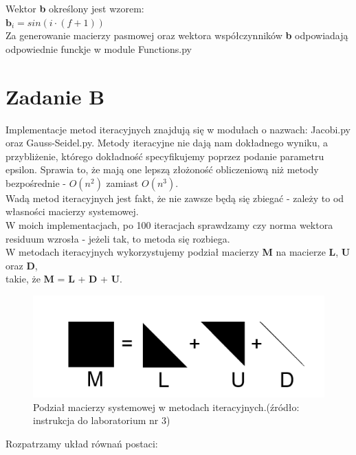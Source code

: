 \documentclass[fleqn]{article}
\begin{document}
    \noindent Wektor \textbf{b} określony jest wzorem:\\

    $\bm{b}_i = sin(i \cdot (f + 1))$ \\  

    \noindent Za generowanie macierzy pasmowej oraz wektora współczynników \textbf{b} odpowiadają
    odpowiednie funckje w module Functions.py
    \newpage


    \section{Zadanie B}
    Implementacje metod iteracyjnych znajdują się w modułach o nazwach: Jacobi.py oraz Gauss-Seidel.py.
    Metody iteracyjne nie dają nam dokładnego wyniku, a przybliżenie, którego dokładność
    specyfikujemy poprzez podanie parametru epsilon. Sprawia to, że mają one lepszą złożoność obliczeniową
    niż metody bezpośrednie - $O(n^2)$ zamiast $O(n^3)$.\\
     Wadą metod iteracyjnych jest fakt, że nie zawsze będą się zbiegać - zależy to 
    od własności macierzy systemowej.\\
    W moich implementacjach, po 100 iteracjach sprawdzamy czy norma wektora residuum wzrosła - jeżeli tak, to metoda się rozbiega. \\ 
    \noindent W metodach iteracyjnych wykorzystujemy podział macierzy \textbf{M} na macierze \textbf{L}, \textbf{U} oraz \textbf{D}, \\ 
    takie, że \textbf{M} = \textbf{L} + \textbf{D} + \textbf{U}.
    
    \begin{figure}[h]

        \centering
        \includegraphics[]{LUD}
        \centering
        \caption{Podział macierzy systemowej w metodach iteracyjnych.(źródło: instrukcja do laboratorium nr 3)}

    \end{figure}

    \noindent Rozpatrzamy układ równań postaci: \\
\end{document}
